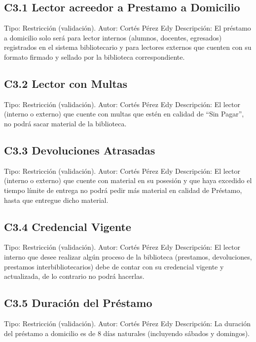 \subsection{C3.1 Lector acreedor a Prestamo a Domicilio }
	\UCli Tipo: Restricción (validación).
	\UCli Autor: Cortés Pérez Edy
	\UCli Descripción: El préstamo a domicilio solo será para lector internos (alumnos, docentes, egresados) registrados en el sistema bibliotecario y para lectores externos que cuenten con su formato firmado y sellado por la biblioteca correspondiente.

\subsection{C3.2 Lector con Multas }
	\UCli Tipo: Restricción (validación).
	\UCli Autor: Cortés Pérez Edy
	\UCli Descripción: El lector (interno o externo) que cuente con multas que estén en calidad de “Sin Pagar”, no podrá sacar material de la biblioteca.
	
\subsection{C3.3 Devoluciones Atrasadas }
	\UCli Tipo: Restricción (validación).
	\UCli Autor: Cortés Pérez Edy
	\UCli Descripción: El lector (interno o externo) que cuente con material en su posesión y que haya excedido el tiempo límite de entrega no podrá pedir más material en calidad de Préstamo, hasta que entregue dicho material.
	
\subsection{C3.4 Credencial Vigente }
	\UCli Tipo: Restricción (validación).
	\UCli Autor: Cortés Pérez Edy
	\UCli Descripción: El lector interno que desee realizar algún proceso de la biblioteca (prestamos, devoluciones, prestamos interbibliotecarios) debe de contar con su credencial vigente y actualizada, de lo contrario no podrá hacerlas.

\subsection{C3.5 Duración del Préstamo }
	\UCli Tipo: Restricción (validación).
	\UCli Autor: Cortés Pérez Edy
	\UCli Descripción: La duración del préstamo a domicilio es de 8 días naturales (incluyendo sábados y domingos).
	
